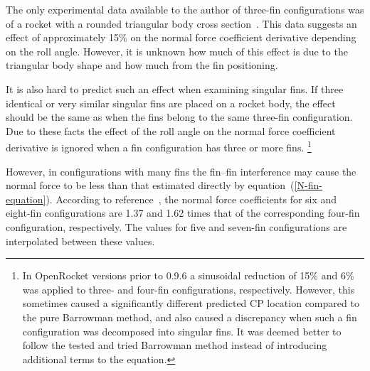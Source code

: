 The only experimental data available to the author of three-fin
configurations was of a rocket with a rounded triangular body cross
section~\cite{triform-fin-data}.  This data suggests an effect of
approximately 15\% on the normal force coefficient derivative
depending on the roll angle.  However, it is unknown how much of this
effect is due to the triangular body shape and how much from the fin
positioning.

It is also hard to predict such an effect when examining singular
fins.  If three identical or very similar singular fins are placed on
a rocket body, the effect should be the same as when the fins belong
to the same three-fin configuration.  Due to these facts the effect of
the roll angle on the normal force coefficient derivative is ignored
when a fin configuration has three or more fins.
%
\footnote{In OpenRocket versions prior to 0.9.6 a sinusoidal reduction
of 15\% and 6\% was applied to three- and four-fin configurations,
respectively.  However, this sometimes caused a significantly
different predicted CP location compared to the pure Barrowman method,
and also caused a discrepancy when such a fin configuration was
decomposed into singular fins.  It was deemed better to follow the
tested and tried Barrowman method instead of introducing additional
terms to the equation.}

However, in configurations with many fins the fin--fin
interference may cause the normal force to be less than that estimated
directly by equation~(\ref{N-fin-equation}).  According to
reference~\cite[p.~5-24]{MIL-HDBK}, the normal force coefficients
for six and eight-fin configurations are 1.37 and 1.62 times that of
the corresponding four-fin configuration, respectively.  The values
for five and seven-fin configurations are interpolated between these
values.

